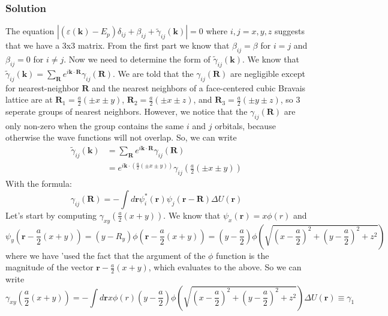 \documentclass{article}
\begin{document}
\subsubsection{Solution}
The equation $|(\varepsilon(\mathbf{k})-E_{p})\delta_{i j}+\beta_{i j}+\tilde{\gamma}_{i j}(\mathbf{k})|=0$ where $i,j=x,y,z$ suggests that we have a 3x3 matrix. From the first part we know that $\beta_{i j} = \beta$ for $i=j$ and $\beta_{i j} = 0$ for $i\neq j$. Now we need to determine the form of $\tilde{\gamma}_{i j}(\mathbf{k})$. We know that $\tilde{\gamma}_{i j}(\mathbf{k}) = \sum_{\mathbf{R}} e^{i \mathbf{k} \cdot \mathbf{R}} \gamma_{i j}(\mathbf{R})$. We are told that the $\gamma_{i j}(\mathbf{R})$ are negligible except for nearest-neighbor $\mathbf{R}$ and the nearest neighbors of a face-centered cubic Bravais lattice are at $\mathbf{R}_1 = \frac{a}{2}\left(\pm x \pm y\right)$, $\mathbf{R}_2 = \frac{a}{2}\left(\pm x \pm z\right)$, and $\mathbf{R}_3 = \frac{a}{2}\left(\pm y \pm z\right)$, so 3 seperate groups of nearest neighbors. However, we notice that the $\gamma_{i j}(\mathbf{R})$ are only non-zero when the group contains the same $i$ and $j$ orbitals, because otherwise the wave functions will not overlap. So, we can write
\begin{align}
    \tilde{\gamma}_{ij}(\mathbf{k}) &= \sum_{\mathbf{R}} e^{i \mathbf{k} \cdot \mathbf{R}} \gamma_{i j}(\mathbf{R})\\
    &= e^{i \mathbf{k} \cdot \left(\frac{a}{2}\left(\pm x \pm y\right)\right)} \gamma_{i j}(\frac{a}{2}\left(\pm x \pm y\right))
    \label{eq:39}
\end{align}
With the formula:
\begin{equation}
    \gamma_{i j}(\mathbf{R}) = -\int d \mathbf{r} \psi_{i}^{*}(\mathbf{r}) \psi_{j}(\mathbf{r}-\mathbf{R}) \Delta U(\mathbf{r})
\end{equation}
Let's start by computing $\gamma_{xy}(\frac{a}{2}\left(x+y\right))$. We know that $\psi_{x}\left(\mathbf{r}\right) = x\phi(r)$ and 
\begin{equation}
\psi_{y}\left(\mathbf{r}-\frac{a}{2}\left(x+y\right)\right) = \left(y-R_y\right)\phi\left(\mathbf{r}-\frac{a}{2}\left(x+y\right)\right) = \left(y-\frac{a}{2}\right) \phi\left(\sqrt{\left(x-\frac{a}{2}\right)^2+\left(y-\frac{a}{2}\right)^2+z^2}\right)
\end{equation}
where we have 'used the fact that the argument of the $\phi$ function is the magnitude of the vector $\mathbf{r}-\frac{a}{2}\left(x+y\right)$, which evaluates to the above. So we can write
\begin{equation}
    \gamma_{xy}(\frac{a}{2}\left(x+y\right)) = -\int d \mathbf{r} x\phi(r) \left(y-\frac{a}{2}\right) \phi\left(\sqrt{\left(x-\frac{a}{2}\right)^2+\left(y-\frac{a}{2}\right)^2+z^2}\right) \Delta U(\mathbf{r}) \equiv \gamma_{1}
\end{equation}
\end{document}
